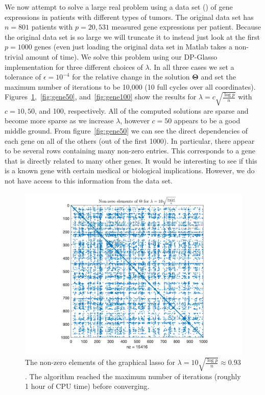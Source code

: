 \documentclass[10pt, letterpaper]{article}
\newcommand{\preci}{\boldsymbol \Theta}
\begin{document}
We now attempt to solve a large real problem using a data set (\cite{dataset}) of gene expressions in patients with different types of tumors.  The original data set has $n=801$ patients with $p = 20,531$ measured gene expressions per patient.  Because the original data set is so large we will truncate it to instead just look at the first $p=1000$ genes (even just loading the original data set in Matlab takes a non-trivial amount of time).  We solve this problem using our DP-Glasso implementation for three different choices of $\lambda$.  In all three cases we set a tolerance of $\epsilon = 10^{-4}$ for the relative change in the solution $\preci$ and set the maximum number of iterations to be 10,000 (10 full cycles over all coordinates).  Figures~\ref{fig:gene10},~\ref{fig:gene50}, and~\ref{fig:gene100} show the results for $\lambda = c\sqrt{\frac{\log p}{n}}$ with $c = 10,50$, and 100, respectively.  All of the computed solutions are sparse and become more sparse as we increase $\lambda$, however $c=50$ appears to be a good middle ground.  From figure~\ref{fig:gene50} we can see the direct dependencies of each gene on all of the others (out of the first 1000).  In particular, there appear to be several rows containing many non-zero entries.  This corresponds to a gene that is directly related to many other genes.  It would be interesting to see if this is a known gene with certain medical or biological implications.  However, we do not have access to this information from the data set.


\begin{figure}
\centering
\includegraphics[width=\textwidth]{plots/gene10.png}
\caption{The non-zero elements of the graphical lasso for $\lambda = 10\sqrt{\frac{\log p}{n}} \approx 0.93$.  The algorithm reached the maximum number of iterations (roughly 1 hour of CPU time) before converging.}
\label{fig:gene10}
\end{figure}
\end{document}
